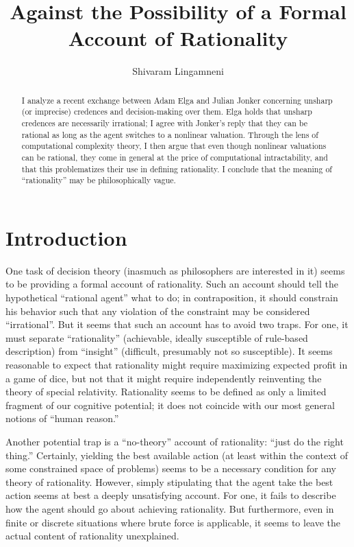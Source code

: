 \documentclass[letterpaper,12pt]{article}
\begin{document}


\title{Against the Possibility of a Formal Account of Rationality}
\author{Shivaram Lingamneni}
\maketitle

\begin{abstract}
I analyze a recent exchange between Adam Elga and Julian Jonker concerning unsharp (or imprecise) credences and decision-making over them. Elga holds that unsharp credences are necessarily irrational; I agree with Jonker's reply that they can be rational as long as the agent switches to a nonlinear valuation. Through the lens of computational complexity theory, I then argue that even though nonlinear valuations can be rational, they come in general at the price of computational intractability, and that this problematizes their use in defining rationality. I conclude that the meaning of ``rationality'' may be philosophically vague.
\end{abstract}

\section{Introduction}
One task of decision theory (inasmuch as philosophers are interested in it) seems to be providing a formal account of rationality. Such an account should tell the hypothetical ``rational agent'' what to do; in contraposition, it should constrain his behavior such that any violation of the constraint may be considered ``irrational''. But it seems that such an account has to avoid two traps. For one, it must separate ``rationality'' (achievable, ideally susceptible of rule-based description) from ``insight'' (difficult, presumably not so susceptible). It seems reasonable to expect that rationality might require maximizing expected profit in a game of dice, but not that it might require independently reinventing the theory of special relativity. Rationality seems to be defined as only a limited fragment of our cognitive potential; it does not coincide with our most general notions of ``human reason.''

Another potential trap is a ``no-theory'' account of rationality: ``just do the right thing.'' Certainly, yielding the best available action (at least within the context of some constrained space of problems) seems to be a necessary condition for any theory of rationality. However, simply stipulating that the agent take the best action seems at best a deeply unsatisfying account. For one, it fails to describe how the agent should go about achieving rationality. But furthermore, even in finite or discrete situations where brute force is applicable, it seems to leave the actual content of rationality unexplained.
\end{document}
